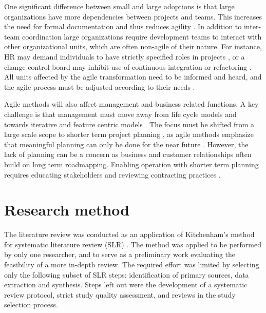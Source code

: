 \documentclass[lnbip]{svmultln}
\begin{document}
One significant difference between small and large adoptions is that large
organizations have more dependencies between projects and teams. This increases
the need for formal documentation and thus reduces agility \cite{Lindvall2004}.
In addition to inter-team coordination large organizations require development
teams to interact with other organizational units, which are often non-agile of
their nature. For instance, HR may demand individuals to have strictly specified
roles in projects \cite{Boehm2005}, or a change control board may inhibit use of
continuous integration or refactoring \cite{Lindvall2004}. All units affected by
the agile transformation need to be informed and heard, and the agile process
must be adjusted according to their needs \cite{Lindvall2004, Cohn2003,
Boehm2005}.

Agile methods will also affect management and business related functions. A key
challenge is that management must move away from life cycle models and towards
iterative and feature centric models \cite{Nerur2005}. The focus must be shifted
from a large scale scope to shorter term project planning \cite{Misra2010}, as
agile methods emphasize that meaningful planning can only be done for the near
future \cite{Cohn2003}. However, the lack of planning can be a concern as
business and customer relationships often build on long term roadmapping.
Enabling operation with shorter term planning requires educating stakeholders
and reviewing contracting practices \cite{Boehm2005}.


\section{Research method}
\label{sec:method}

%
%
%


The literature review was conducted as an application of Kitchenham's
method for systematic literature review (SLR) \cite{Kitchenham2007}. The method
was applied to be performed by only one researcher, and to serve as a
preliminary work evaluating the feasibility of a more in-depth review. The
required effort was limited by selecting only the following subset of SLR steps:
identification of primary sources, data extraction and synthesis. Steps left out
were the development of a systematic review protocol, strict study quality
assessment, and reviews in the study selection process.
\end{document}
